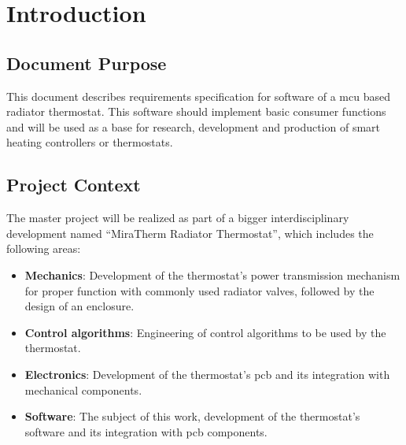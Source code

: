 %
%

\chapter{Introduction}
\label{chap:Introduction}
%

\section{Document Purpose}
This document describes requirements specification for software of a \ac{mcu} based radiator thermostat. This software should implement basic consumer functions and will be used as a base for research, development and production of smart heating controllers or thermostats.

\section{Project Context}
The master project will be realized as part of a bigger interdisciplinary development named ``MiraTherm Radiator Thermostat'', which includes the following areas:

\begin{itemize}
	\item \textbf{Mechanics}: Development of the thermostat's power transmission mechanism for proper function with commonly used radiator valves, followed by the design of an enclosure.
	\item \textbf{Control algorithms}: Engineering of control algorithms to be used by the thermostat.
	\item \textbf{Electronics}: Development of the thermostat's \ac{pcb} and its integration with mechanical components.
	\item \textbf{Software}: The subject of this work, development of the thermostat's software and its integration with \acs{pcb} components.
\end{itemize}